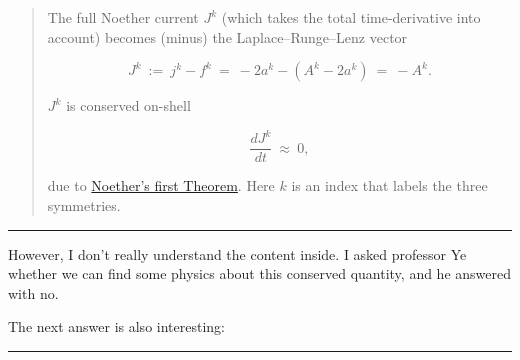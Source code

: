 \documentclass{article}
\numberwithin{equation}{subsection} %
\theoremstyle{definition}
\begin{document}
\begin{quote}
        The full Noether current $J^k$ (which takes the total time-derivative into account) becomes (minus) the Laplace–Runge–Lenz vector

        $$ J^k~:=~j^k-f^k~=~ -2a^k-(A^k-2a^k)~=~ -A^k.$$

        $J^k$ is conserved on-shell 

        $$\frac{dJ^k}{dt} ~\approx~  0,$$  

        due to \href{http://en.wikipedia.org/wiki/Noether%27s_theorem}{Noether's first Theorem}. Here $k$ is an index that labels the three symmetries.
    \end{quote}

    \begin{center}\noindent\rule{8cm}{0.4pt}\end{center}

    However, I don't really understand the content inside. I asked professor
    Ye whether we can find some physics about this conserved quantity, and
    he answered with no.

    The next answer is also interesting:
    
    \begin{center}\noindent\rule{8cm}{0.4pt}\end{center}
\end{document}

